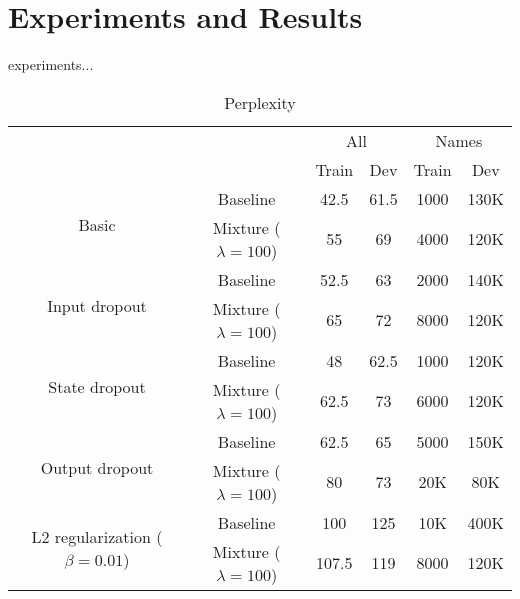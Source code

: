 \chapter{Experiments and Results}

experiments... 

\begin{table}[]
	\centering
	\begin{tabular}{cc|c|c|c|c|}
		\cline{3-6}
		\multicolumn{1}{l}{}                                                    & \multicolumn{1}{l|}{}   & \multicolumn{2}{c|}{All} & \multicolumn{2}{c|}{Names} \\ \cline{3-6} 
		&                         & Train       & Dev        & Train        & Dev         \\ \hline
		\multicolumn{1}{|c|}{\multirow{2}{*}{Basic}}                            & Baseline                & 42.5        & 61.5       & 1000         & 130K        \\ \cline{2-6} 
		\multicolumn{1}{|c|}{}                                                  & Mixture ($\lambda=100$) & 55          & 69         & 4000         & 120K        \\ \hline
		\multicolumn{1}{|c|}{\multirow{2}{*}{Input dropout}}                    & Baseline                & 52.5        & 63         & 2000         & 140K        \\ \cline{2-6} 
		\multicolumn{1}{|c|}{}                                                  & Mixture ($\lambda=100$) & 65          & 72         & 8000         & 120K        \\ \hline
		\multicolumn{1}{|c|}{\multirow{2}{*}{State dropout}}                    & Baseline                & 48          & 62.5       & 1000         & 120K        \\ \cline{2-6} 
		\multicolumn{1}{|c|}{}                                                  & Mixture ($\lambda=100$) & 62.5        & 73         & 6000         & 120K        \\ \hline
		\multicolumn{1}{|c|}{\multirow{2}{*}{Output dropout}}                   & Baseline                & 62.5        & 65         & 5000         & 150K        \\ \cline{2-6} 
		\multicolumn{1}{|c|}{}                                                  & Mixture ($\lambda=100$) & 80          & 73         & 20K          & 80K         \\ \hline
		\multicolumn{1}{|c|}{\multirow{2}{*}{L2 regularization ($\beta=0.01$)}} & Baseline                & 100         & 125        & 10K          & 400K        \\ \cline{2-6} 
		\multicolumn{1}{|c|}{}                                                  & Mixture ($\lambda=100$) & 107.5       & 119        & 8000         & 120K        \\ \hline
	\end{tabular}
	\caption{Perplexity}
	\label{my-label}
\end{table}